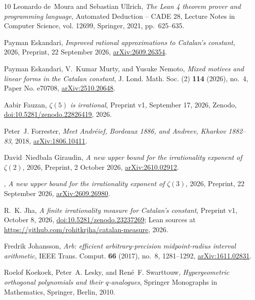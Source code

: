 \documentclass[11pt]{amsart}
\theoremstyle{definition}
\theoremstyle{remark}
\numberwithin{equation}{section}
\begin{document}
\begin{thebibliography}{10}
Leonardo de~Moura and Sebastian Ullrich, \emph{The {L}ean 4 theorem prover and
  programming language}, Automated Deduction -- CADE 28, Lecture Notes in
  Computer Science, vol. 12699, Springer, 2021, pp.~625--635.

Payman Eskandari, \emph{Improved rational approximations to {C}atalan's
  constant}, 2026, Preprint, 22 September 2026,
  \href{https://arxiv.org/abs/2609.26354}{arXiv:2609.26354}.

Payman Eskandari, V.~Kumar Murty, and Yusuke Nemoto, \emph{Mixed motives and
  linear forms in the {C}atalan constant}, J. Lond. Math. Soc. (2) \textbf{114}
  (2026), no.~4, Paper No. e70708,
  \href{https://arxiv.org/abs/2510.20648}{arXiv:2510.20648}.

Aabir Fauzan, \emph{{$\zeta(5)$} is irrational}, Preprint v1, September 17,
  2026, Zenodo,
  \href{https://doi.org/10.5281/zenodo.22826419}{doi:10.5281/zenodo.22826419},
  2026.

Peter~J. Forrester, \emph{Meet {A}ndr\'eief, {B}ordeaux 1886, and {A}ndreev,
  {K}harkov 1882--83}, 2018,
  \href{https://arxiv.org/abs/1806.10411}{arXiv:1806.10411}.

David~Niedbala Giraudin, \emph{A new upper bound for the irrationality exponent
  of {$\zeta(2)$}}, 2026, Preprint, 2 October 2026,
  \href{https://arxiv.org/abs/2610.02912}{arXiv:2610.02912}.

\bysame, \emph{A new upper bound for the irrationality exponent of
  {$\zeta(3)$}}, 2026, Preprint, 22 September 2026,
  \href{https://arxiv.org/abs/2609.26980}{arXiv:2609.26980}.

R.~K. Jha, \emph{A finite irrationality measure for {C}atalan's constant},
  Preprint v1, October 8, 2026,
  \href{https://doi.org/10.5281/zenodo.23237269}{doi:10.5281/zenodo.23237269};
  Lean sources at \url{https://github.com/rohitkrjha/catalan-measure}, 2026.

Fredrik Johansson, \emph{Arb: efficient arbitrary-precision midpoint-radius
  interval arithmetic}, IEEE Trans. Comput. \textbf{66} (2017), no.~8,
  1281--1292, \href{https://arxiv.org/abs/1611.02831}{arXiv:1611.02831}.

Roelof Koekoek, Peter~A. Lesky, and Ren\'e~F. Swarttouw, \emph{Hypergeometric
  orthogonal polynomials and their {$q$}-analogues}, Springer Monographs in
  Mathematics, Springer, Berlin, 2010.


\end{thebibliography}
\end{document}
